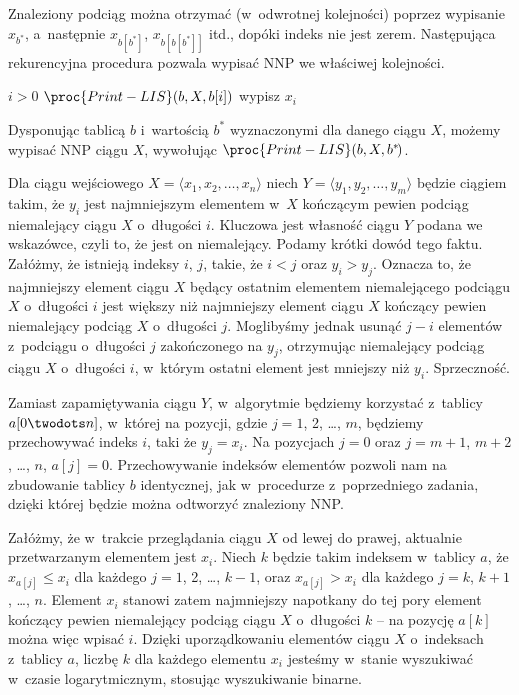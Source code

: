 Znaleziony podciąg można otrzymać (w~odwrotnej kolejności) poprzez wypisanie $x_{b^*\!}$, a~następnie $x_{b[b^*\!]}$, $x_{b[b[b^*\!]]}$ itd., dopóki indeks nie jest zerem.
Następująca rekurencyjna procedura pozwala wypisać NNP we właściwej kolejności.
\begin{codebox}
\li	\If $i>0$
\li		\Then $\proc{Print-LIS}(b,X,b[i])$
\li			wypisz $x_i$
		\End
\end{codebox}
Dysponując tablicą $b$ i~wartością $b^*\!$ wyznaczonymi dla danego ciągu $X$, możemy wypisać NNP ciągu $X$, wywołując $\proc{Print-LIS}(b,X,b^*\!)$.

\exercise %
Dla ciągu wejściowego $X=\langle x_1,x_2,\dots,x_n\rangle$ niech $Y=\langle y_1,y_2,\dots,y_m\rangle$ będzie ciągiem takim, że $y_i$ jest najmniejszym elementem w~$X$ kończącym pewien podciąg niemalejący ciągu $X$ o~długości $i$.
Kluczowa jest własność ciągu $Y$ podana we wskazówce, czyli to, że jest on niemalejący.
Podamy krótki dowód tego faktu.
Załóżmy, że istnieją indeksy $i$, $j$, takie, że $i<j$ oraz $y_i>y_j$.
Oznacza to, że najmniejszy element ciągu $X$ będący ostatnim elementem niemalejącego podciągu $X$ o~długości $i$ jest większy niż najmniejszy element ciągu $X$ kończący pewien niemalejący podciąg $X$ o~długości $j$.
Moglibyśmy jednak usunąć $j-i$ elementów z~podciągu o~długości $j$ zakończonego na $y_j$, otrzymując niemalejący podciąg ciągu $X$ o~długości $i$, w~którym ostatni element jest mniejszy niż $y_i$.
Sprzeczność.

Zamiast zapamiętywania ciągu $Y$, w~algorytmie będziemy korzystać z~tablicy $a[0\twodots n]$, w~której na  pozycji, gdzie $j=1$, 2, \dots, $m$, będziemy przechowywać indeks $i$, taki że $y_j=x_i$.
Na pozycjach $j=0$ oraz $j=m+1$, $m+2$, \dots, $n$, $a[j]=0$.
Przechowywanie indeksów elementów pozwoli nam na zbudowanie tablicy $b$ identycznej, jak w~procedurze  z~poprzedniego zadania, dzięki której będzie można odtworzyć znaleziony NNP.

Załóżmy, że w~trakcie przeglądania ciągu $X$ od lewej do prawej, aktualnie przetwarzanym elementem jest $x_i$.
Niech $k$ będzie takim indeksem w~tablicy $a$, że $x_{a[j]}\le x_i$ dla każdego $j=1$, 2, \dots, $k-1$, oraz $x_{a[j]}>x_i$ dla każdego $j=k$, $k+1$, \dots, $n$.
Element $x_i$ stanowi zatem najmniejszy napotkany do tej pory element kończący pewien niemalejący podciąg ciągu $X$ o~długości $k$ -- na pozycję $a[k]$ można więc wpisać $i$.
Dzięki uporządkowaniu elementów ciągu $X$ o~indeksach z~tablicy $a$, liczbę $k$ dla każdego elementu $x_i$ jesteśmy w~stanie wyszukiwać w~czasie logarytmicznym, stosując wyszukiwanie binarne.

